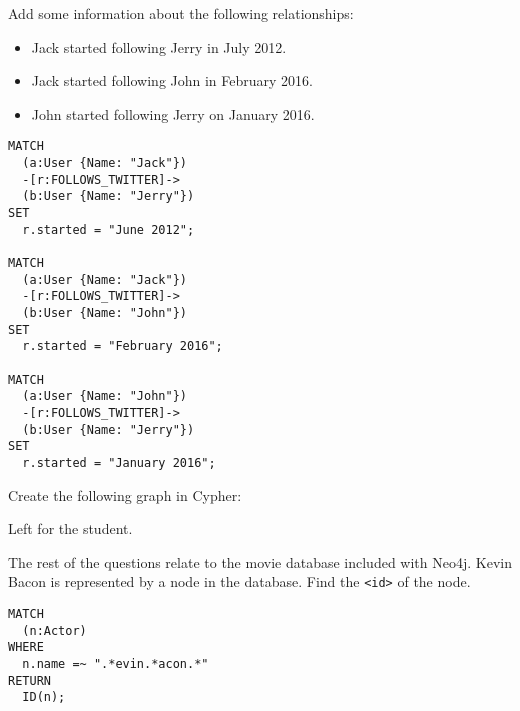 \documentclass[a4paper, 12pt]{exam}
\begin{document}
\begin{questions}
\question
Add some information about the following relationships:
\begin{itemize}
  \item Jack started following Jerry in July 2012.
  \item Jack started following John in February 2016.
  \item John started following Jerry on January 2016.
\end{itemize}

\begin{solution}
  \begin{verbatim}
MATCH
  (a:User {Name: "Jack"})
  -[r:FOLLOWS_TWITTER]->
  (b:User {Name: "Jerry"})
SET
  r.started = "June 2012";
	
MATCH
  (a:User {Name: "Jack"})
  -[r:FOLLOWS_TWITTER]->
  (b:User {Name: "John"})
SET
  r.started = "February 2016";
	
MATCH
  (a:User {Name: "John"})
  -[r:FOLLOWS_TWITTER]->
  (b:User {Name: "Jerry"})
SET
  r.started = "January 2016";
  \end{verbatim}
\end{solution}

\question
  Create the following graph in Cypher:
  \begin{center}
  \end{center}
\begin{solution}
Left for the student.
\end{solution}


\question
The rest of the questions relate to the movie database included with Neo4j.
Kevin Bacon is represented by a node in the database.
Find the \texttt{<id>} of the node.
\begin{solution}
\begin{verbatim}
MATCH
  (n:Actor)
WHERE
  n.name =~ ".*evin.*acon.*"
RETURN
  ID(n);
\end{verbatim}
\end{solution}



\end{questions}
\end{document}
